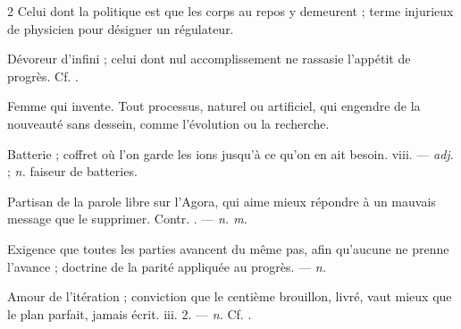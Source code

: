 \begin{multicols}{2}
 Celui dont la politique est que les corps au repos y demeurent ; terme injurieux de physicien pour désigner un régulateur.

 Dévoreur d'infini ; celui dont nul accomplissement ne rassasie l'appétit de progrès. Cf. .

  Femme qui invente.   Tout processus, naturel ou artificiel, qui engendre de la nouveauté sans dessein, comme l'évolution ou la recherche.

 Batterie ; coffret où l'on garde les ions jusqu'à ce qu'on en ait besoin.   viii. —  \textit{adj.} ;  \textit{n.} faiseur de batteries.

 Partisan de la parole libre sur l'Agora, qui aime mieux répondre à un mauvais message que le supprimer. Contr. . —  \textit{n. m.}

 Exigence que toutes les parties avancent du même pas, afin qu'aucune ne prenne l'avance ; doctrine de la parité appliquée au progrès. —  \textit{n.}

 Amour de l'itération ; conviction que le centième brouillon, livré, vaut mieux que le plan parfait, jamais écrit.   iii. 2. —  \textit{n.} Cf. .

\end{multicols}

